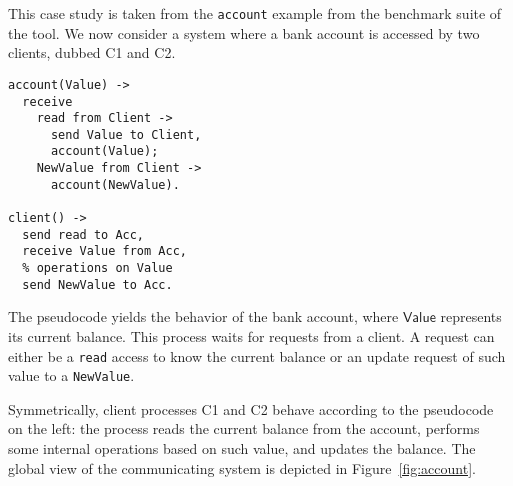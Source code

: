 This case study is taken from the \texttt{account} example from the benchmark 
suite of the tool.
We now consider a system where a bank account is accessed
by two clients, dubbed C1 and C2.
% 

\begin{lstlisting}
account(Value) ->
  receive
    read from Client ->
      send Value to Client,
      account(Value);
    NewValue from Client ->
      account(NewValue).

client() ->
  send read to Acc,
  receive Value from Acc,
  % operations on Value
  send NewValue to Acc.
\end{lstlisting}

The pseudocode yields the behavior of the bank account,
where $\mathsf{Value}$ represents its current balance.
This process waits for requests from a client.
A request can either be a \lstinline{read} access to know
the current balance or an update request of such value to a
\lstinline{NewValue}.

Symmetrically, client processes C1 and C2 behave according to the
pseudocode on the left: the process reads the current balance
from the account,
performs some internal operations based on such value, and
updates the balance.
%
The global view of the communicating system is depicted in
Figure~\ref{fig:account}.

